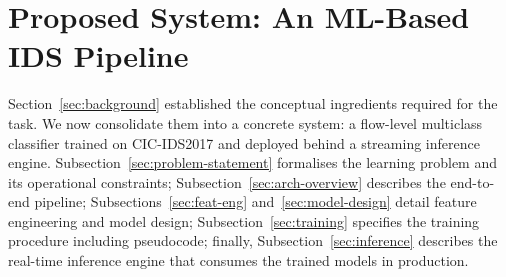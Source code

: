 \section{Proposed System: An ML-Based IDS Pipeline}
\label{sec:models}

Section~\ref{sec:background} established the conceptual ingredients required for the task. We now consolidate them into a concrete system: a flow-level multiclass classifier trained on CIC-IDS2017 and deployed behind a streaming inference engine. Subsection~\ref{sec:problem-statement} formalises the learning problem and its operational constraints; Subsection~\ref{sec:arch-overview} describes the end-to-end pipeline; Subsections~\ref{sec:feat-eng} and~\ref{sec:model-design} detail feature engineering and model design; Subsection~\ref{sec:training} specifies the training procedure including pseudocode; finally, Subsection~\ref{sec:inference} describes the real-time inference engine that consumes the trained models in production.












